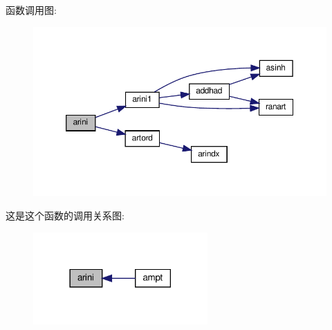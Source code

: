 函数调用图\+:
\nopagebreak
\begin{figure}[H]
\begin{center}
\leavevmode
\includegraphics[width=350pt]{arini_8f90_a79db49cba428fb8b4e312299e29f407e_cgraph}
\end{center}
\end{figure}
这是这个函数的调用关系图\+:
\nopagebreak
\begin{figure}[H]
\begin{center}
\leavevmode
\includegraphics[width=189pt]{arini_8f90_a79db49cba428fb8b4e312299e29f407e_icgraph}
\end{center}
\end{figure}
